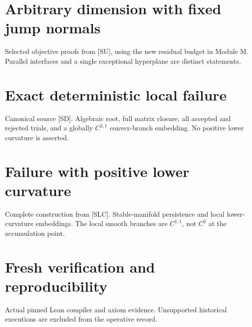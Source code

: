 \documentclass[10pt,oneside,openany]{book}
\newcommand{\ModuleTag}{I}
\theoremstyle{remark}\newtheorem{remark}{Remark}[chapter]
\newcommand{\StartModule}[3]{\cleardoublepage\renewcommand{\ModuleTag}{#1}\chapter{#2}\label{#1:chapter}\begin{small}\color{Accent}#3\end{small}\par\vspace{3pt}{\color{RuleGray}\hrule}\vspace{9pt}}
\begin{document}

\StartModule{U}{Arbitrary dimension with fixed jump normals}{Selected objective proofs from [SU], using the new residual budget in Module M. Parallel interfaces and a single exceptional hyperplane are distinct statements.}


\StartModule{D}{Exact deterministic local failure}{Canonical source [SD]. Algebraic root, full matrix closure, all accepted and rejected trials, and a globally $C^{2,1}$ convex-branch embedding. No positive lower curvature is asserted.}


\StartModule{L}{Failure with positive lower curvature}{Complete construction from [SLC]. Stable-manifold persistence and local lower-curvature embeddings. The local smooth branches are $C^{1,1}$, not $C^2$ at the accumulation point.}


\StartModule{E}{Fresh verification and reproducibility}{Actual pinned Lean compiler and axiom evidence. Unsupported historical executions are excluded from the operative record.}



\backmatter\renewcommand{\ModuleTag}{B}
\end{document}
